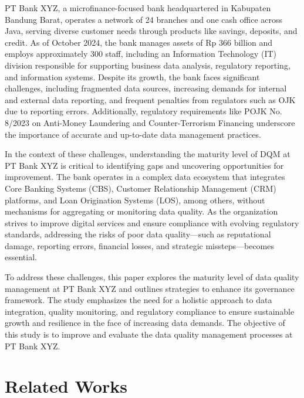 \documentclass[conference]{IEEEtran}
\begin{document}
PT Bank XYZ, a microfinance-focused bank headquartered in Kabupaten Bandung Barat, operates a network of 24 branches and one cash office across Java, serving diverse customer needs through products like savings, deposits, and credit. As of October 2024, the bank manages assets of Rp 366 billion and employs approximately 300 staff, including an Information Technology (IT) division responsible for supporting business data analysis, regulatory reporting, and information systems. Despite its growth, the bank faces significant challenges, including fragmented data sources, increasing demands for internal and external data reporting, and frequent penalties from regulators such as OJK due to reporting errors. Additionally, regulatory requirements like POJK No. 8/2023 on Anti-Money Laundering and Counter-Terrorism Financing underscore the importance of accurate and up-to-date data management practices.

In the context of these challenges, understanding the maturity level of DQM at PT Bank XYZ is critical to identifying gaps and uncovering opportunities for improvement. The bank operates in a complex data ecosystem that integrates Core Banking Systems (CBS), Customer Relationship Management (CRM) platforms, and Loan Origination Systems (LOS), among others, without mechanisms for aggregating or monitoring data quality. As the organization strives to improve digital services and ensure compliance with evolving regulatory standards, addressing the risks of poor data quality—such as reputational damage, reporting errors, financial losses, and strategic missteps—becomes essential.

To address these challenges, this paper explores the maturity level of data quality management at PT Bank XYZ and outlines strategies to enhance its governance framework. The study emphasizes the need for a holistic approach to data integration, quality monitoring, and regulatory compliance to ensure sustainable growth and resilience in the face of increasing data demands. The objective of this study is to improve and evaluate the data quality management processes at PT Bank XYZ.

\section{Related Works}
\end{document}
